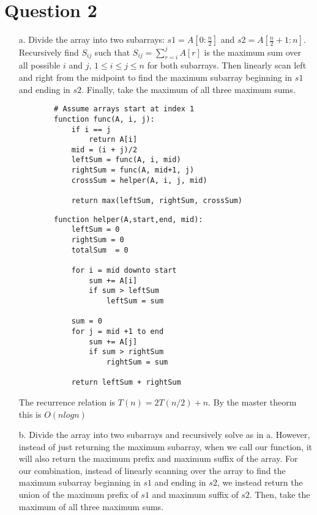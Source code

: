 \documentclass[12pt]{article}
\begin{document}
\section*{Question 2}
\begin{enumerate}
    \item[a.] Divide the array into two subarrays: $s1 = A[0:\frac{n}{2}]$ and $s2 = A[\frac{n}{2} + 1:n]$. Recursively find $S_{ij}$ such that $S_{ij} = \sum_{r=i}^j A[r]$ is the maximum sum over all possible $i$ and $j$, $1 \leq i \leq j \leq n$ for both subarrays. Then linearly scan left and right from the midpoint to find the maximum subarray beginning in $s1$ and ending in $s2$. Finally, take the maximum of all three maximum sums. 
    \begin{verbatim}
        # Assume arrays start at index 1
        function func(A, i, j):
            if i == j
                return A[i]
            mid = (i + j)/2
            leftSum = func(A, i, mid)
            rightSum = func(A, mid+1, j)
            crossSum = helper(A, i, j, mid)
        
            return max(leftSum, rightSum, crossSum)
    \end{verbatim}
    
    \begin{verbatim}
        function helper(A,start,end, mid):
            leftSum = 0
            rightSum = 0
            totalSum  = 0
        
            for i = mid downto start
                sum += A[i]
                if sum > leftSum
                    leftSum = sum
            
            sum = 0
            for j = mid +1 to end
                sum += A[j]
                if sum > rightSum
                    rightSum = sum
            
            return leftSum + rightSum
    \end{verbatim}
    
    The recurrence relation is $T(n) = 2T(n/2) + n$. By the master theorm this is $O(nlogn)$
    
    \item[b.] Divide the array into two subarrays and recursively solve as in a. However, instead of just returning the maximum subarray, when we call our function, it will also return the maximum prefix and maximum suffix of the array. For our combination, instead of linearly scanning over the array to find the maximum subarray beginning in $s1$ and ending in $s2$, we instead return the union of the maximum prefix of $s1$ and maximum suffix of $s2$. Then, take the maximum of all three maximum sums.
\end{enumerate}
\end{document}
